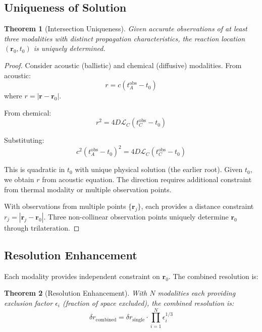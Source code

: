 \documentclass[11pt,a4paper]{article}
\newtheorem{theorem}{Theorem}[section]
\theoremstyle{remark}
\newcommand{\rxnpos}{\mathbf{r}_0}
\newcommand{\rxntime}{t_0}
\newcommand{\obspos}{\mathbf{r}}
\begin{document}
\subsection{Uniqueness of Solution}

\begin{theorem}[Intersection Uniqueness]
\label{thm:intersection}
Given accurate observations of at least three modalities with distinct propagation characteristics, the reaction location $(\rxnpos, \rxntime)$ is uniquely determined.
\end{theorem}

\begin{proof}
Consider acoustic (ballistic) and chemical (diffusive) modalities. From acoustic:
\begin{equation}
    r = c(t_A^{\text{obs}} - \rxntime)
\end{equation}
where $r = |\obspos - \rxnpos|$.

From chemical:
\begin{equation}
    r^2 = 4D\mathcal{L}_C(t_C^{\text{obs}} - \rxntime)
\end{equation}

Substituting:
\begin{equation}
    c^2(t_A^{\text{obs}} - \rxntime)^2 = 4D\mathcal{L}_C(t_C^{\text{obs}} - \rxntime)
\end{equation}

This is quadratic in $\rxntime$ with unique physical solution (the earlier root). Given $\rxntime$, we obtain $r$ from acoustic equation. The direction requires additional constraint from thermal modality or multiple observation points.

With observations from multiple points $\{\obspos_j\}$, each provides a distance constraint $r_j = |\obspos_j - \rxnpos|$. Three non-collinear observation points uniquely determine $\rxnpos$ through trilateration.
\end{proof}

\subsection{Resolution Enhancement}

Each modality provides independent constraint on $\rxnpos$. The combined resolution is:

\begin{theorem}[Resolution Enhancement]
\label{thm:resolution}
With $N$ modalities each providing exclusion factor $\epsilon_i$ (fraction of space excluded), the combined resolution is:
\begin{equation}
    \delta r_{\text{combined}} = \delta r_{\text{single}} \cdot \prod_{i=1}^N \epsilon_i^{1/3}
\end{equation}
\end{theorem}
\end{document}
